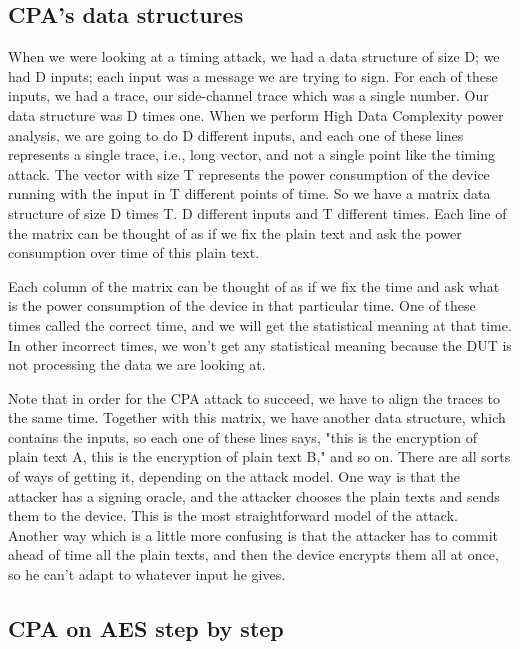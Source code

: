 \subsection{CPA's data structures}\label{c8_CPA_data_structures:subsec}

When we were looking at a timing attack, we had a data structure of size D; we
had D inputs; each input was a message we are trying to sign. For each of these
inputs, we had a trace, our side-channel trace which was a single number.
Our data structure was D times one. When we perform High Data Complexity power
analysis, we are going to do D different inputs, and each one of these lines
represents a single trace, i.e., long vector, and not a single point like the
timing attack. The vector with size T represents the power consumption of the device
running with the input in T different points of time. So we have a matrix data
structure of size D times T. D different inputs and T different times. Each line
of the matrix can be thought of as if we fix the plain text and ask the power
consumption over time of this plain text.

Each column of the matrix can be thought of as if we fix the time and ask what is the
power consumption of the device in that particular time. One of these times
called the correct time, and we will get the statistical meaning at that time. In
other incorrect times, we won't get any statistical meaning because the DUT is
not processing the data we are looking at.

Note that in order for the CPA attack to succeed, we have to align the traces to
the same time. Together with this matrix, we have another data structure, which contains
the inputs, so each one of these lines says, "this is the encryption of plain
text A, this is the encryption of plain text B," and so on. There are all sorts of
ways of getting it, depending on the attack model. One way is that the attacker
has a signing oracle, and the attacker chooses the plain texts and sends them to
the device. This is the most straightforward model of the attack. Another way which is a
little more confusing is that the attacker has to commit ahead of time all the
plain texts, and then the device encrypts them all at once, so he can't adapt to
whatever input he gives.

\subsection{CPA on AES step by step}\label{c8_CPA_overview:subsec}

